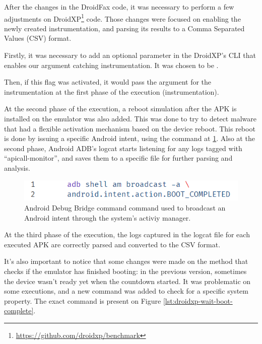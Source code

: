 After the changes in the DroidFax code, it was necessary to perform a few adjustments on DroidXP\footnote{\url{https://github.com/droidxp/benchmark}} code. Those changes were focused on enabling the newly created instrumentation, and parsing its results to a Comma Separated Values (CSV) format.

Firstly, it was necessary to add an optional parameter in the DroidXP's CLI that enables our argument catching instrumentation. It was chosen to be .

Then, if this flag was activated, it would pass the  argument for the instrumentation at the first phase of the execution (instrumentation). 

At the second phase of the execution, a reboot simulation after the APK is installed on the emulator was also added. This was done to try to detect malware that had a flexible activation mechanism based on the device reboot. This reboot is done by issuing a specific Android intent, using the command at \ref{lst:droidxp-intent-reboot}. Also at the second phase, Android ADB's logcat \cite{noauthor_logcat_2023} starts listening for any logs tagged with ``apicall-monitor'', and saves them to a specific file for further parsing and analysis.

\begin{figure}
    \centering
    \includegraphics{img/adb-boot.png}
    \caption{Android Debug Bridge command command used to broadcast an Android intent through the system's activiy manager.}
    \label{lst:droidxp-intent-reboot}
\end{figure}


At the third phase of the execution, the logs captured in the logcat file for each executed APK are correctly parsed and converted to the CSV format.

It's also important to notice that some changes were made on the method that checks if the emulator has finished booting: in the previous version, sometimes the device wasn't ready yet when the countdown started. It was problematic on some executions, and a new command was added to check for a specific system property. The exact command is present on Figure \ref{lst:droidxp-wait-boot-complete}.

